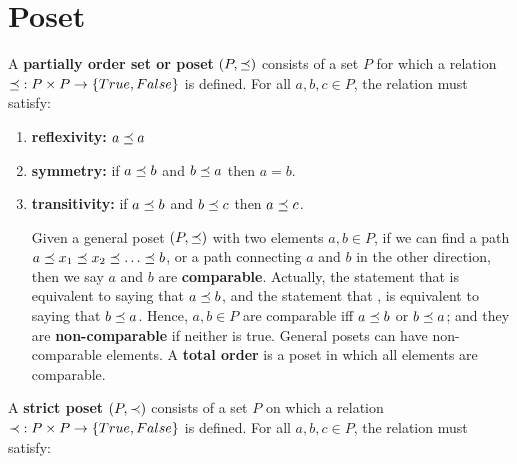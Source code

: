\chapter{Poset}
\label{ch-poset}

A {\bf partially order set or poset}
$(P, \preceq )$
consists of a set $P$ for  which a relation $\preceq\;: P\times P\rightarrow \{True, False\} $ is defined. For all $a,b,c\in P$, the  relation must
satisfy:

\begin{enumerate}
\item
{\bf reflexivity:}
$a\preceq  a$

\item
{\bf symmetry:}
if $a\preceq  b$ and $b\preceq  a$ then $a=b$.

\item{\bf transitivity:}
if $a\preceq  b$ and $b\preceq  c$ then $a\preceq  c$.

Given a general poset $(P, \preceq)$ with two elements $a, b\in P$,
if we can find a path  $a\preceq x_1 \preceq x_2\preceq\ldots\preceq b$,
or a path connecting $a$ and $b$  in the other direction,  then we say $a$ and $b$ are {\bf comparable}.
Actually, the statement that 
is  equivalent to saying that
$a\preceq b$, and  the statement that ,  is equivalent to
saying that $b\preceq a$. Hence,
$a, b\in P$ are comparable iff $a\preceq b$ or $b\preceq a$;
and they are {\bf non-comparable}
if neither is true.
General posets can have
non-comparable elements.
A {\bf total order} is a poset
in which all elements are comparable.

\end{enumerate}

A {\bf strict poset} $(P, \prec )$
consists of a set $P$ on which a relation $\prec\;: P\times P\rightarrow \{True, False\} $ is defined. For all $a,b,c\in P$, the  relation must
satisfy:

